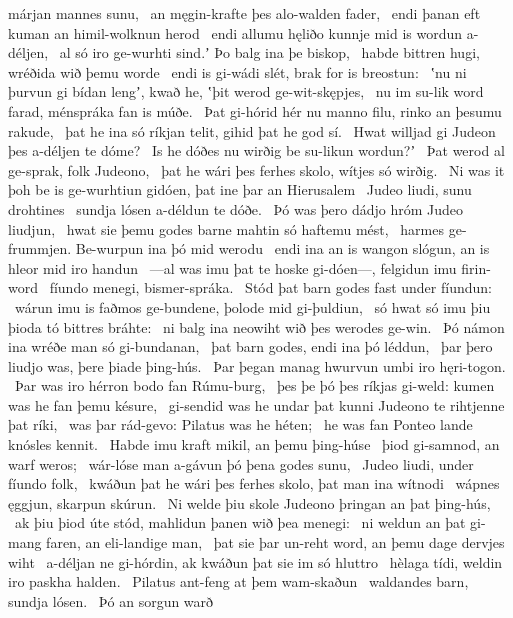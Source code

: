 márjan mannes sunu, \hld\ an męgin-krafte
þes alo-walden fader, \hld\ endi þanan eft kuman
an himil-wolknun herod \hld\ endi allumu hęliðo kunnje
mid is wordun a-déljen, \hld\ al só iro ge-wurhti sind.ʼ
Þo balg ina þe biskop, \hld\ habde bittren hugi,
wréðida wið þemu worde \hld\ endi is gi-wádi slét,
brak for is breostun: \hld\ ʽnu ni þurvun gi bídan lengʼ, kwað he,
ʽþit werod ge-wit-skępjes, \hld\ nu im su-lik word farad,
ménspráka fan is múðe. \hld\ Þat gi-hórid hér nu manno filu,
rinko an þesumu rakude, \hld\ þat he ina só ríkjan telit,
gihid þat he god sí. \hld\ Hwat willjad gi Judeon þes
a-déljen te dóme? \hld\ Is he dóðes nu
wirðig be su-likun wordun?ʼ \hld\ Þat werod al ge-sprak,
folk Judeono, \hld\ þat he wári þes ferhes skolo,
wítjes só wirðig. \hld\ Ni was it þoh be is ge-wurhtiun gidóen,
þat ine þar an Hierusalem \hld\ Judeo liudi,
sunu drohtines \hld\ sundja lósen
a-déldun te dóðe. \hld\ Þó was þero dádjo hróm
Judeo liudjun, \hld\ hwat sie þemu godes barne mahtin
só haftemu mést, \hld\ harmes ge-frummjen.
Be-wurpun ina þó mid werodu \hld\ endi ina an is wangon slógun,
an is hleor mid iro handun \hld\ —al was imu þat te hoske gi-dóen—,
felgidun imu firin-word \hld\ fíundo menegi,
bismer-spráka. \hld\ Stód þat barn godes
fast under fíundun: \hld\ wárun imu is faðmos ge-bundene,
þolode mid gi-þuldiun, \hld\ só hwat só imu þiu þioda tó
bittres bráhte: \hld\ ni balg ina neowiht
wið þes werodes ge-win. \hld\ Þó námon ina wréðe man
só gi-bundanan, \hld\ þat barn godes,
endi ina þó léddun, \hld\ þar þero liudjo was,
þere þiade þing-hús. \hld\ Þar þegan manag
hwurvun umbi iro hęri-togon. \hld\ Þar was iro hérron bodo
fan Rúmu-burg, \hld\ þes þe þó þes ríkjas gi-weld:
kumen was he fan þemu késure, \hld\ gi-sendid was he undar þat kunni Judeono
te rihtjenne þat ríki, \hld\ was þar rád-gevo:
Pilatus was he héten; \hld\ he was fan Ponteo lande
knósles kennit. \hld\ Habde imu kraft mikil,
an þemu þing-húse \hld\ þiod gi-samnod,
an warf weros; \hld\ wár-lóse man
a-gávun þó þena godes sunu, \hld\ Judeo liudi,
under fíundo folk, \hld\ kwáðun þat he wári þes ferhes skolo,
þat man ina wítnodi \hld\ wápnes ęggjun,
skarpun skúrun. \hld\ Ni welde þiu skole Judeono
þringan an þat þing-hús, \hld\ ak þiu þiod úte stód,
mahlidun þanen wið þea menegi: \hld\ ni weldun an þat gi-mang faren,
an eli-landige man, \hld\ þat sie þar un-reht word,
an þemu dage dervjes wiht \hld\ a-déljan ne gi-hórdin,
ak kwáðun þat sie im só hluttro \hld\ hèlaga tídi,
weldin iro paskha halden. \hld\ Pilatus ant-feng
at þem wam-skaðun \hld\ waldandes barn,
sundja lósen. \hld\ Þó an sorgun warð
